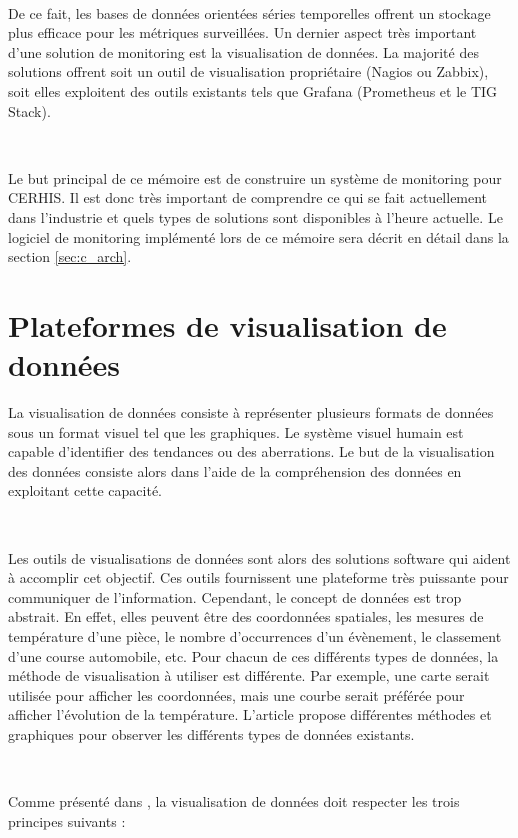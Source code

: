 ~

\noindent
De ce fait, les bases de données orientées séries temporelles offrent un stockage plus efficace pour les métriques surveillées. Un dernier aspect très important d'une solution de monitoring est la visualisation de données. La majorité des solutions offrent soit un outil de visualisation propriétaire (Nagios ou Zabbix), soit elles exploitent des outils existants tels que Grafana (Prometheus et le TIG Stack).

~

\noindent
Le but principal de ce mémoire est de construire un système de monitoring pour CERHIS. Il est donc très important de comprendre ce qui se fait actuellement dans l'industrie et quels types de solutions sont disponibles à l'heure actuelle. Le logiciel de monitoring implémenté lors de ce mémoire sera décrit en détail dans la section \ref{sec:c_arch}.


\section{Plateformes de visualisation de données}

\noindent
La visualisation de données consiste à représenter plusieurs formats de données sous un format visuel tel que les graphiques. Le système visuel humain est capable d'identifier des tendances ou des aberrations. Le but de la visualisation des données consiste alors dans l'aide de la compréhension des données en exploitant cette capacité. \cite{zoo_data}

~

\noindent
Les outils de visualisations de données sont alors des solutions software qui aident à accomplir cet objectif. \cite{bikakis2018big} Ces outils fournissent une plateforme très puissante pour communiquer de l'information. Cependant, le concept de données est trop abstrait. En effet, elles peuvent être des coordonnées spatiales, les mesures de température d'une pièce, le nombre d'occurrences d'un évènement, le classement d'une course automobile, etc. Pour chacun de ces différents types de données, la méthode de visualisation à utiliser est différente. Par exemple, une carte serait utilisée pour afficher les coordonnées, mais une courbe serait préférée pour afficher l'évolution de la température. L'article \cite{zoo_data} propose différentes méthodes et graphiques pour observer les différents types de données existants.

~

\noindent
Comme présenté dans \cite{kirk2019data}, la visualisation de données doit respecter les trois principes suivants :

